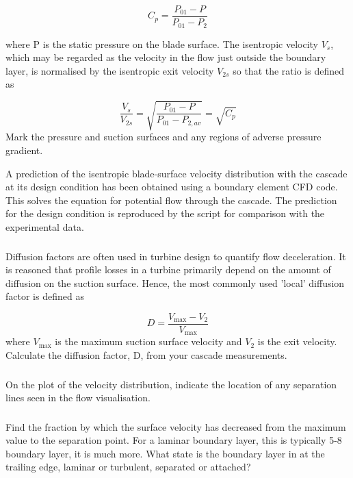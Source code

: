 \documentclass{article}
\begin{document}
\begin{equation}
    C_p = \frac{P_{01} - P}{P_{01} - P_2}
\end{equation}

where P is the static pressure on the blade surface. The isentropic velocity
$V_s$, which may be
regarded as the velocity in the flow just outside the boundary layer, is normalised by the
isentropic exit velocity
$V_{2s}$ so that the ratio is defined as

\begin{equation}
    \frac{V_s}{V_{2s}} = \sqrt{\frac{P_{01} - P}{P_{01} - P_{2,av}}} = \sqrt{C_p}
\end{equation}
Mark the pressure and suction surfaces and any regions of adverse pressure gradient.

A prediction of the isentropic blade-surface velocity distribution with the cascade at its
design condition has been obtained using a boundary element CFD code. This solves the
equation for potential flow through the cascade. The prediction for the design condition is
reproduced by the script for comparison with the experimental data.

\subsubsection{}
Diffusion factors are often used in turbine design to quantify flow deceleration. It is
reasoned that profile losses in a turbine primarily depend on the amount of diffusion on the
suction surface. Hence, the most commonly used 'local' diffusion factor is defined as

\begin{equation}
    D = \frac{V_\text{max} - V_2}{V_\text{max}}
\end{equation}
where
$V_\text{max}$ is the maximum suction surface velocity and
$V_2$ is the exit velocity. Calculate the
diffusion factor, D, from your cascade measurements.

\subsubsection{}
On the plot of the velocity distribution, indicate the location of any separation lines seen
in the flow visualisation.

\subsubsection{}
Find the fraction by which the surface velocity has decreased from the maximum value
to the separation point. For a laminar boundary layer, this is typically 5-8%
boundary layer, it is much more. What state is the boundary layer in at the trailing edge, laminar
or turbulent, separated or attached?
\end{document}
